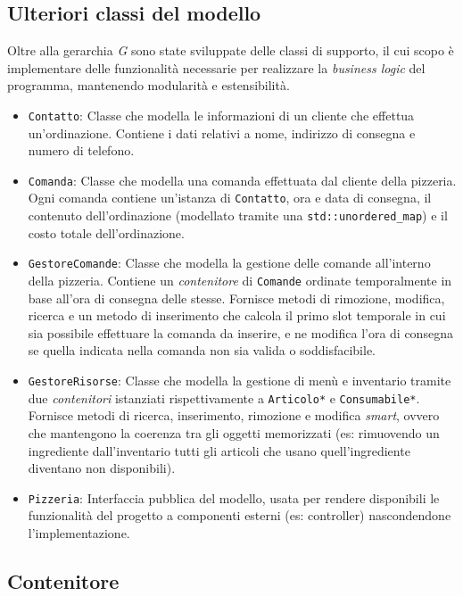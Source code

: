 \documentclass[
  10pt,
]{article}
\begin{document}
\hypertarget{ulteriori-classi-del-modello}{%
\subsection{Ulteriori classi del
modello}\label{ulteriori-classi-del-modello}}

Oltre alla gerarchia \emph{G} sono state sviluppate delle classi di
supporto, il cui scopo è implementare delle funzionalità necessarie per
realizzare la \emph{business logic} del programma, mantenendo modularità
e estensibilità.

\begin{itemize}
\item
  \texttt{Contatto}: Classe che modella le informazioni di un cliente
  che effettua un'ordinazione. Contiene i dati relativi a nome,
  indirizzo di consegna e numero di telefono.
\item
  \texttt{Comanda}: Classe che modella una comanda effettuata dal
  cliente della pizzeria. Ogni comanda contiene un'istanza di
  \texttt{Contatto}, ora e data di consegna, il contenuto
  dell'ordinazione (modellato tramite una \texttt{std::unordered\_map})
  e il costo totale dell'ordinazione.
\item
  \texttt{GestoreComande}: Classe che modella la gestione delle comande
  all'interno della pizzeria. Contiene un \emph{contenitore} di
  \texttt{Comande} ordinate temporalmente in base all'ora di consegna
  delle stesse. Fornisce metodi di rimozione, modifica, ricerca e un
  metodo di inserimento che calcola il primo slot temporale in cui sia
  possibile effettuare la comanda da inserire, e ne modifica l'ora di
  consegna se quella indicata nella comanda non sia valida o
  soddisfacibile.
\item
  \texttt{GestoreRisorse}: Classe che modella la gestione di menù e
  inventario tramite due \emph{contenitori} istanziati rispettivamente a
  \texttt{Articolo*} e \texttt{Consumabile*}. Fornisce metodi di
  ricerca, inserimento, rimozione e modifica \emph{smart}, ovvero che
  mantengono la coerenza tra gli oggetti memorizzati (es: rimuovendo un
  ingrediente dall'inventario tutti gli articoli che usano
  quell'ingrediente diventano non disponibili).
\item
  \texttt{Pizzeria}: Interfaccia pubblica del modello, usata per rendere
  disponibili le funzionalità del progetto a componenti esterni (es:
  controller) nascondendone l'implementazione.
\end{itemize}

\hypertarget{contenitore}{%
\subsection{Contenitore}\label{contenitore}}
\end{document}
